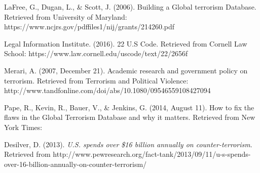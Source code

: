 \documentclass[10pt,a4paper]{article}
\begin{document}
\begin{thebibliography}{9}
LaFree, G., Dugan, L., \& Scott, J. (2006). Building a Global terrorism Database. 
Retrieved from University of Maryland: https://www.ncjrs.gov/pdffiles1/nij/grants/214260.pdf

Legal Information Institute. (2016). 22 U.S Code. 
Retrieved from Cornell Law School: https://www.law.cornell.edu/uscode/text/22/2656f

Merari, A. (2007, December 21). Academic research and government policy on terrorism. 
Retrieved from Terrorism and Political Violence: http://www.tandfonline.com/doi/abs/10.1080/09546559108427094

Pape, R., Kevin, R., Bauer, V., \& Jenkins, G. (2014, August 11). How to fix the flaws in the Global Terrorism Database and why it matters. Retrieved from New York Times: 

Desilver, D. (2013). \textit{U.S. spends over \$16 billion annually on counter-terrorism}.
Retrieved from http://www.pewresearch.org/fact-tank/2013/09/11/u-s-spends-over-16-billion-annually-on-counter-terrorism/

\end{thebibliography}
\end{document}
